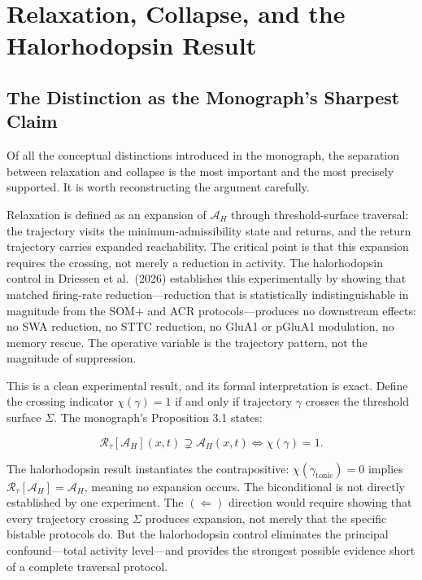 \documentclass[12pt, a4paper]{article}
\theoremstyle{definition}
\begin{document}
\section{Relaxation, Collapse, and the Halorhodopsin Result}

\subsection{The Distinction as the Monograph's Sharpest Claim}

Of all the conceptual distinctions introduced in the monograph, the separation between relaxation and collapse is the most important and the most precisely supported. It is worth reconstructing the argument carefully.

Relaxation is defined as an expansion of $\mathcal{A}_H$ through threshold-surface traversal: the trajectory visits the minimum-admissibility state and returns, and the return trajectory carries expanded reachability. The critical point is that this expansion requires the crossing, not merely a reduction in activity. The halorhodopsin control in Driessen et al.\ (2026) establishes this experimentally by showing that matched firing-rate reduction---reduction that is statistically indistinguishable in magnitude from the SOM+ and ACR protocols---produces no downstream effects: no SWA reduction, no STTC reduction, no GluA1 or pGluA1 modulation, no memory rescue. The operative variable is the trajectory pattern, not the magnitude of suppression.

This is a clean experimental result, and its formal interpretation is exact. Define the crossing indicator $\chi(\gamma) = 1$ if and only if trajectory $\gamma$ crosses the threshold surface $\Sigma$. The monograph's Proposition 3.1 states:

\begin{equation}
\mathcal{R}_\tau[\mathcal{A}_H](x,t) \supsetneq \mathcal{A}_H(x,t) \iff \chi(\gamma) = 1.
\end{equation}

The halorhodopsin result instantiates the contrapositive: $\chi(\gamma_{\mathrm{tonic}}) = 0$ implies $\mathcal{R}_\tau[\mathcal{A}_H] = \mathcal{A}_H$, meaning no expansion occurs. The biconditional is not directly established by one experiment. The $(\Leftarrow)$ direction would require showing that every trajectory crossing $\Sigma$ produces expansion, not merely that the specific bistable protocols do. But the halorhodopsin control eliminates the principal confound---total activity level---and provides the strongest possible evidence short of a complete traversal protocol.
\end{document}
